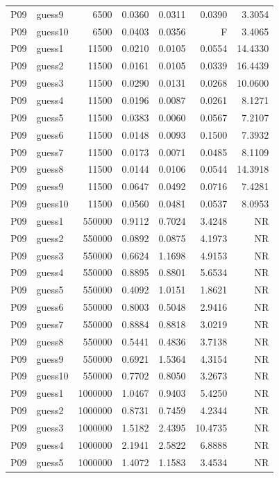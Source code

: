 {\begin{longtable}{llrrrrr}
P09 & guess9 & 6500 & 0.0360 & 0.0311 & 0.0390 & 3.3054 \\
P09 & guess10 & 6500 & 0.0403 & 0.0356 & F & 3.4065 \\
P09 & guess1 & 11500 & 0.0210 & 0.0105 & 0.0554 & 14.4330 \\
P09 & guess2 & 11500 & 0.0161 & 0.0105 & 0.0339 & 16.4439 \\
P09 & guess3 & 11500 & 0.0290 & 0.0131 & 0.0268 & 10.0600 \\
P09 & guess4 & 11500 & 0.0196 & 0.0087 & 0.0261 & 8.1271 \\
P09 & guess5 & 11500 & 0.0383 & 0.0060 & 0.0567 & 7.2107 \\
P09 & guess6 & 11500 & 0.0148 & 0.0093 & 0.1500 & 7.3932 \\
P09 & guess7 & 11500 & 0.0173 & 0.0071 & 0.0485 & 8.1109 \\
P09 & guess8 & 11500 & 0.0144 & 0.0106 & 0.0544 & 14.3918 \\
P09 & guess9 & 11500 & 0.0647 & 0.0492 & 0.0716 & 7.4281 \\
P09 & guess10 & 11500 & 0.0560 & 0.0481 & 0.0537 & 8.0953 \\
P09 & guess1 & 550000 & 0.9112 & 0.7024 & 3.4248 & NR \\
P09 & guess2 & 550000 & 0.0892 & 0.0875 & 4.1973 & NR \\
P09 & guess3 & 550000 & 0.6624 & 1.1698 & 4.9153 & NR \\
P09 & guess4 & 550000 & 0.8895 & 0.8801 & 5.6534 & NR \\
P09 & guess5 & 550000 & 0.4092 & 1.0151 & 1.8621 & NR \\
P09 & guess6 & 550000 & 0.8003 & 0.5048 & 2.9416 & NR \\
P09 & guess7 & 550000 & 0.8884 & 0.8818 & 3.0219 & NR \\
P09 & guess8 & 550000 & 0.5441 & 0.4836 & 3.7138 & NR \\
P09 & guess9 & 550000 & 0.6921 & 1.5364 & 4.3154 & NR \\
P09 & guess10 & 550000 & 0.7702 & 0.8050 & 3.2673 & NR \\
P09 & guess1 & 1000000 & 1.0467 & 0.9403 & 5.4250 & NR \\
P09 & guess2 & 1000000 & 0.8731 & 0.7459 & 4.2344 & NR \\
P09 & guess3 & 1000000 & 1.5182 & 2.4395 & 10.4735 & NR \\
P09 & guess4 & 1000000 & 2.1941 & 2.5822 & 6.8888 & NR \\
P09 & guess5 & 1000000 & 1.4072 & 1.1583 & 3.4534 & NR \\

\end{longtable}}
